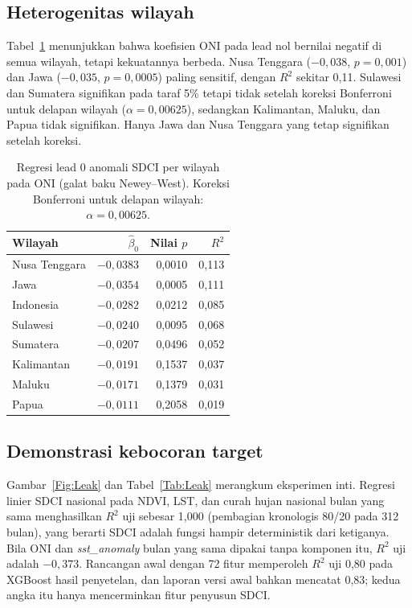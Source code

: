 \documentclass[11pt,twoside]{article}
\begin{document}
\subsection{Heterogenitas wilayah}
\label{SubSec:Regions}

Tabel~\ref{Tab:Regions} menunjukkan bahwa koefisien ONI pada lead nol bernilai negatif di semua wilayah, tetapi kekuatannya berbeda. Nusa Tenggara ($-0{,}038$, $p = 0{,}001$) dan Jawa ($-0{,}035$, $p = 0{,}0005$) paling sensitif, dengan $R^2$ sekitar 0,11. Sulawesi dan Sumatera signifikan pada taraf 5\% tetapi tidak setelah koreksi Bonferroni untuk delapan wilayah ($\alpha = 0{,}00625$), sedangkan Kalimantan, Maluku, dan Papua tidak signifikan. Hanya Jawa dan Nusa Tenggara yang tetap signifikan setelah koreksi.

\begin{table}[ht]
\centering
\caption{Regresi lead 0 anomali SDCI per wilayah pada ONI (galat baku Newey--West). Koreksi Bonferroni untuk delapan wilayah: $\alpha = 0{,}00625$.}
\label{Tab:Regions}
\small
\begin{tabular}{lrrr}
\toprule
Wilayah & $\hat\beta_0$ & Nilai $p$ & $R^2$ \\
\midrule
Nusa Tenggara & $-0{,}0383$ & 0,0010 & 0,113 \\
Jawa          & $-0{,}0354$ & 0,0005 & 0,111 \\
Indonesia     & $-0{,}0282$ & 0,0212 & 0,085 \\
Sulawesi      & $-0{,}0240$ & 0,0095 & 0,068 \\
Sumatera      & $-0{,}0207$ & 0,0496 & 0,052 \\
Kalimantan    & $-0{,}0191$ & 0,1537 & 0,037 \\
Maluku        & $-0{,}0171$ & 0,1379 & 0,031 \\
Papua         & $-0{,}0111$ & 0,2058 & 0,019 \\
\bottomrule
\end{tabular}
\end{table}

\subsection{Demonstrasi kebocoran target}
\label{SubSec:Leak}

Gambar~\ref{Fig:Leak} dan Tabel~\ref{Tab:Leak} merangkum eksperimen inti. Regresi linier SDCI nasional pada NDVI, LST, dan curah hujan nasional bulan yang sama menghasilkan $R^2$ uji sebesar 1,000 (pembagian kronologis 80/20 pada 312 bulan), yang berarti SDCI adalah fungsi hampir deterministik dari ketiganya. Bila ONI dan \textit{sst\_anomaly} bulan yang sama dipakai tanpa komponen itu, $R^2$ uji adalah $-0{,}373$. Rancangan awal dengan 72 fitur memperoleh $R^2$ uji 0,80 pada XGBoost hasil penyetelan, dan laporan versi awal bahkan mencatat 0,83; kedua angka itu hanya mencerminkan fitur penyusun SDCI.
\end{document}
